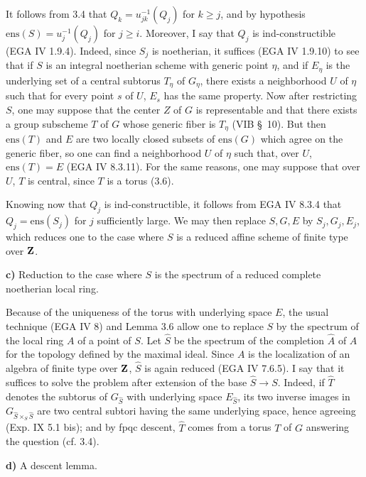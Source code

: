 It follows from 3.4 that $Q_k=u_{jk}^{-1}(Q_j)$ for $k\geq j$, and by hypothesis $\mathrm{ens}(S)=u_j^{-1}(Q_j)$ for $j\geq i$. Moreover, I say that $Q_j$ is ind-constructible (EGA IV 1.9.4). Indeed, since $S_j$ is noetherian, it suffices (EGA IV 1.9.10) to see that if $S$ is an integral noetherian scheme with generic point $\eta$, and if $E_\eta$ is the underlying set of a central subtorus $T_\eta$ of $G_\eta$, there exists a neighborhood $U$ of $\eta$ such that for every point $s$ of $U$, $E_s$ has the same property. Now after restricting $S$, one may suppose that the center $Z$ of $G$ is representable and that there exists a group subscheme $T$ of $G$ whose generic fiber is $T_\eta$ (VIB \S~10). But then $\mathrm{ens}(T)$ and $E$ are two locally closed subsets of $\mathrm{ens}(G)$ which agree on the generic fiber, so one can find a neighborhood $U$ of $\eta$ such that, over $U$, $\mathrm{ens}(T)=E$ (EGA IV 8.3.11). For the same reasons, one may suppose that over $U$, $T$ is central, since $T$ is a torus (3.6).

Knowing now that $Q_j$ is ind-constructible, it follows from EGA IV 8.3.4 that $Q_j=\mathrm{ens}(S_j)$ for $j$ sufficiently large. We may then replace $S,G,E$ by $S_j,G_j,E_j$, which reduces one to the case where $S$ is a reduced affine scheme of finite type over $\mathbf{Z}$.

\noindent\textbf{c)} Reduction to the case where $S$ is the spectrum of a reduced complete noetherian local ring.

Because of the uniqueness of the torus with underlying space $E$, the usual technique (EGA IV 8) and Lemma 3.6 allow one to replace $S$ by the spectrum of the local ring $A$ of a point of $S$. Let $\widehat S$ be the spectrum of the completion $\widehat A$ of $A$ for the topology defined by the maximal ideal. Since $A$ is the localization of an algebra of finite type over $\mathbf{Z}$, $\widehat S$ is again reduced (EGA IV 7.6.5). I say that it suffices to solve the problem after extension of the base $\widehat S\to S$. Indeed, if $\widehat T$ denotes the subtorus of $G_{\widehat S}$ with underlying space $E_{\widehat S}$, its two inverse images in $G_{\widehat S\times_S\widehat S}$ are two central subtori having the same underlying space, hence agreeing (Exp. IX 5.1 bis); and by fpqc descent, $\widehat T$ comes from a torus $T$ of $G$ answering the question (cf. 3.4).

\noindent\textbf{d)} A descent lemma.

